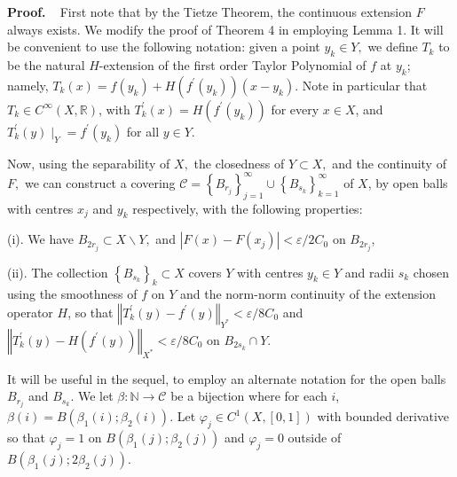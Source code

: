 \documentclass[11pt]{amsproc}%
\theoremstyle{plain}
\numberwithin{equation}{section}
\begin{document}
\noindent\textbf{Proof.\ \ }First note that by the Tietze Theorem, the
continuous extension $F$ always exists. We modify the proof of Theorem 4 in
\cite{AFGJL} employing Lemma 1. It will be convenient to use the following
notation: given a point $y_{k}\in Y,$ we define $T_{k}$ to be the natural
$H$-extension of the first order Taylor Polynomial of $f$ at $y_{k}$; namely,
$T_{k}\left(  x\right)  =f\left(  y_{k}\right)  +H(f^{\prime}\left(
y_{k}\right)  )\left(  x-y_{k}\right)  $. Note in particular that $T_{k}\in
C^{\infty}(X,\mathbb{R})$, with $T_{k}^{\prime}(x)=H(f^{\prime}(y_{k}))$ for
every $x\in X$, and $T_{k}^{\prime}(y)\mid_{Y}=f^{\prime}(y_{k})$ for all
$y\in Y$.

\medskip

\noindent Now, using the separability of $X,$ the closedness of $Y\subset X,$
and the continuity of $F,$ we can construct a covering $\mathcal{C=}\left\{
B_{r_{j}}\right\}  _{j=1}^{\infty}\cup\left\{  B_{s_{k}}\right\}
_{k=1}^{\infty}$ of $X$, by open balls with centres $x_{j}$ and $y_{k}$
respectively, with the following properties:

\medskip

(i). We have $B_{2r_{j}}\subset X\backslash Y,$ and $|F\left(  x\right)
-F\left(  x_{j}\right)  |<\varepsilon/2C_{0}$ on $B_{2r_{j}}$,

\medskip

(ii). The collection $\left\{  B_{s_{k}}\right\}  _{k}\subset X$ covers $Y$
with centres $y_{k}\in Y$ and radii $s_{k}$ chosen using the smoothness of $f$
on $Y$ and the norm-norm continuity of the extension operator $H$, so that
$\left\Vert T_{k}^{\prime}\left(  y\right)  -f^{\prime}\left(  y\right)
\right\Vert _{Y^{\ast}}<\varepsilon/8C_{0}$ and $\left\Vert T_{k}^{\prime
}\left(  y\right)  -H(f^{\prime}(y))\right\Vert _{X^{\ast}}<\varepsilon
/8C_{0}$ on $B_{2s_{k}}\cap Y.$



\medskip

\noindent It will be useful in the sequel, to employ an alternate notation for
the open balls $B_{r_{j}}$ and $B_{s_{k}}.$ We let $\beta:\mathbb{N}%
\rightarrow\mathcal{C}$ be a bijection where for each $i$, $\beta
(i)=B(\beta_{1}(i);\beta_{2}(i))$. Let $\varphi_{j}\in C^{1}\left(  X,\left[
0,1\right]  \right)  $ with bounded derivative so that $\varphi_{j}=1$ on
$B(\beta_{1}(j);\beta_{2}(j))$ and $\varphi_{j}=0$ outside of $B(\beta
_{1}(j);2\beta_{2}(j))$.
\end{document}
